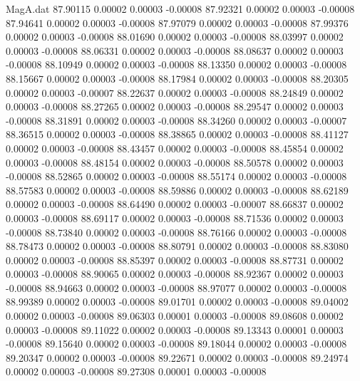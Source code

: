 \begin{filecontents}{MagA.dat}
  87.90115    0.00002    0.00003   -0.00008
  87.92321    0.00002    0.00003   -0.00008
  87.94641    0.00002    0.00003   -0.00008
  87.97079    0.00002    0.00003   -0.00008
  87.99376    0.00002    0.00003   -0.00008
  88.01690    0.00002    0.00003   -0.00008
  88.03997    0.00002    0.00003   -0.00008
  88.06331    0.00002    0.00003   -0.00008
  88.08637    0.00002    0.00003   -0.00008
  88.10949    0.00002    0.00003   -0.00008
  88.13350    0.00002    0.00003   -0.00008
  88.15667    0.00002    0.00003   -0.00008
  88.17984    0.00002    0.00003   -0.00008
  88.20305    0.00002    0.00003   -0.00007
  88.22637    0.00002    0.00003   -0.00008
  88.24849    0.00002    0.00003   -0.00008
  88.27265    0.00002    0.00003   -0.00008
  88.29547    0.00002    0.00003   -0.00008
  88.31891    0.00002    0.00003   -0.00008
  88.34260    0.00002    0.00003   -0.00007
  88.36515    0.00002    0.00003   -0.00008
  88.38865    0.00002    0.00003   -0.00008
  88.41127    0.00002    0.00003   -0.00008
  88.43457    0.00002    0.00003   -0.00008
  88.45854    0.00002    0.00003   -0.00008
  88.48154    0.00002    0.00003   -0.00008
  88.50578    0.00002    0.00003   -0.00008
  88.52865    0.00002    0.00003   -0.00008
  88.55174    0.00002    0.00003   -0.00008
  88.57583    0.00002    0.00003   -0.00008
  88.59886    0.00002    0.00003   -0.00008
  88.62189    0.00002    0.00003   -0.00008
  88.64490    0.00002    0.00003   -0.00007
  88.66837    0.00002    0.00003   -0.00008
  88.69117    0.00002    0.00003   -0.00008
  88.71536    0.00002    0.00003   -0.00008
  88.73840    0.00002    0.00003   -0.00008
  88.76166    0.00002    0.00003   -0.00008
  88.78473    0.00002    0.00003   -0.00008
  88.80791    0.00002    0.00003   -0.00008
  88.83080    0.00002    0.00003   -0.00008
  88.85397    0.00002    0.00003   -0.00008
  88.87731    0.00002    0.00003   -0.00008
  88.90065    0.00002    0.00003   -0.00008
  88.92367    0.00002    0.00003   -0.00008
  88.94663    0.00002    0.00003   -0.00008
  88.97077    0.00002    0.00003   -0.00008
  88.99389    0.00002    0.00003   -0.00008
  89.01701    0.00002    0.00003   -0.00008
  89.04002    0.00002    0.00003   -0.00008
  89.06303    0.00001    0.00003   -0.00008
  89.08608    0.00002    0.00003   -0.00008
  89.11022    0.00002    0.00003   -0.00008
  89.13343    0.00001    0.00003   -0.00008
  89.15640    0.00002    0.00003   -0.00008
  89.18044    0.00002    0.00003   -0.00008
  89.20347    0.00002    0.00003   -0.00008
  89.22671    0.00002    0.00003   -0.00008
  89.24974    0.00002    0.00003   -0.00008
  89.27308    0.00001    0.00003   -0.00008

\end{filecontents}
